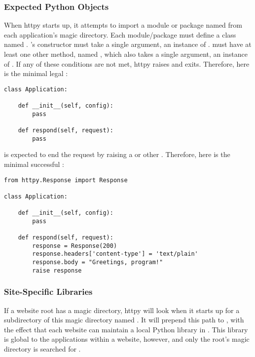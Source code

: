 \subsubsection{Expected Python Objects}

When httpy starts up, it attempts to import a module or package named
 from each application's magic directory. Each 
module/package must define a class named .
's constructor must take a single argument, an instance of
.  must have at least one other method,
named , which also takes a single argument, an instance of
. If any of these conditions are not met, httpy raises
 and exits. Therefore, here is the minimal legal
:

\begin{verbatim}
class Application:

    def __init__(self, config):
        pass

    def respond(self, request):
        pass

\end{verbatim}

 is expected to end the request by raising a
 or other . Therefore, here is the minimal
successful :

\begin{verbatim}
from httpy.Response import Response

class Application:

    def __init__(self, config):
        pass

    def respond(self, request):
        response = Response(200)
        response.headers['content-type'] = 'text/plain'
        response.body = "Greetings, program!"
        raise response

\end{verbatim}



\subsubsection{Site-Specific Libraries}

If a website root has a magic directory, httpy will look when it starts up for a
subdirectory of this magic directory named . It will prepend
this path to , with the effect that each website can maintain a
local Python library in . This library is
global to the applications within a website, however, and only the root's magic
directory is searched for .


